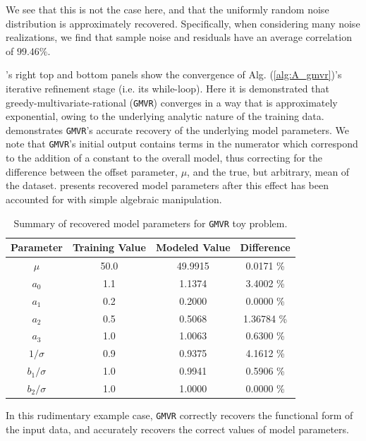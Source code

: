\documentclass[twocolumn,aps,prd,floatfix,preprintnumbers,a4paper,nofootinbib,
superscriptaddress,10pt]{revtex4-1}
\def\gmvr#1{greedy-multivariate-rational#1
  (\texttt{GMVR}#1)\gdef\gmvr{\texttt{GMVR}}}
\begin{document}
%
We see that this is not the case here, and that the uniformly random noise distribution is approximately recovered.
%
Specifically, when considering many noise realizations, we find that sample noise and residuals have an average correlation of $99.46\%$.
%
\par {}'s right top and bottom panels show the convergence of Alg. (\ref{alg:A_gmvr})'s iterative refinement stage (i.e. its while-loop).
%
Here it is demonstrated that \gmvr{} converges in a way that is approximately exponential, owing to the underlying analytic nature of the training data.
%
 demonstrates \gmvr{}'s accurate recovery of the underlying model parameters.
%
We note that \gmvr{}'s initial output contains terms in the numerator which correspond to the addition of a constant to the overall model, thus correcting for the difference between the offset parameter, $\mu$, and the true, but arbitrary, mean of the dataset.
%
 presents recovered model parameters after this effect has been accounted for with simple algebraic manipulation.
%
%
%
\begin{table}
  \caption{Summary of recovered model parameters for \gmvr{} toy problem.}
  \label{tb:gmvrtoy}
  \begin{tabular}{|c|c|c|c|}
    \hline
    \hline
    Parameter & Training Value & Modeled Value & Difference \\ \hline \hline
    $\mu$ & 50.0 & 49.9915 & 0.0171 \% \\ \hline
    $a_0$ & 1.1 & 1.1374 & 3.4002 \% \\ \hline
    $a_1$ & 0.2 & 0.2000 & 0.0000 \% \\ \hline
    $a_2$ & 0.5 & 0.5068 & 1.36784 \% \\ \hline
    $a_3$ & 1.0 & 1.0063 & 0.6300 \% \\ \hline
    $1/\sigma$ & 0.9 & 0.9375 & 4.1612 \% \\ \hline
    $b_1/\sigma$ & 1.0 & 0.9941 & 0.5906 \% \\ \hline
    $b_2/\sigma$ & 1.0 & 1.0000 & 0.0000 \% \\ \hline
    \hline
  \end{tabular}

\end{table}
%
%
\par In this rudimentary example case, \gmvr{} correctly recovers the functional form of the input data, and accurately recovers the correct values of model parameters.
\end{document}
